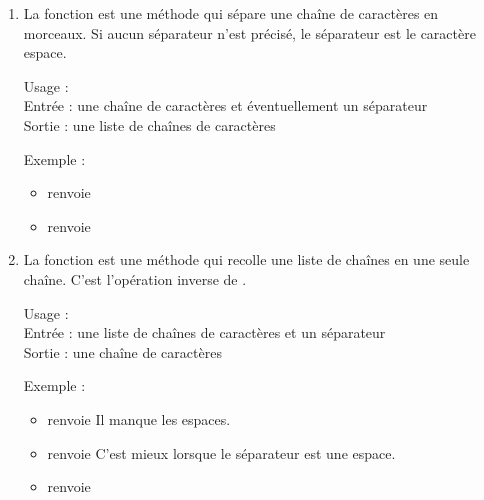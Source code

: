\documentclass[11pt,class=report,crop=false]{standalone}
\begin{document}


\begin{cours}
\sauteligne

\begin{enumerate}
  \item  La fonction  est une méthode \Python{} qui sépare une chaîne de caractères en morceaux. Si aucun séparateur n'est précisé, le séparateur est le caractère espace.
  
  \begin{fonctionpython}
    Usage : \\
    Entrée : une chaîne de caractères  et éventuellement un séparateur   \\
    Sortie : une liste de chaînes de caractères
  
  \medskip
     
   Exemple :
  \begin{itemize}  
    \item {} renvoie 
    \item {} renvoie \ci{['12.5', '17.5', '18']}
  \end{itemize} 
  \end{fonctionpython}  
  
  \item La fonction  est une méthode \Python{} qui recolle une liste de chaînes en une seule chaîne. C'est l'opération inverse de .
  
   \begin{fonctionpython}
    Usage : \\
    Entrée : une liste de chaînes de caractères  et un séparateur   \\
    Sortie : une chaîne de caractères
  
  \medskip
     
   Exemple :
  \begin{itemize}  
    \item {} renvoie  Il manque les espaces.
    \item {} renvoie    C'est mieux lorsque le séparateur est une espace.
    \item {} renvoie   
  \end{itemize} 
  \end{fonctionpython}  


\end{enumerate}
\end{cours}
\end{document}
